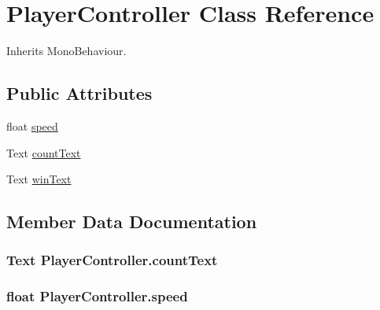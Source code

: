 \hypertarget{class_player_controller}{}\section{Player\+Controller Class Reference}
\label{class_player_controller}


Inherits Mono\+Behaviour.

\subsection*{Public Attributes}
\begin{DoxyCompactItemize}
\item 
float \hyperlink{class_player_controller_a0928605583f0563cd84fe43119d336ec}{speed}
\item 
Text \hyperlink{class_player_controller_a61795bee5f0ca4705f688419919e3086}{count\+Text}
\item 
Text \hyperlink{class_player_controller_a366f431ae274e7b19365f7b15b1709b8}{win\+Text}
\end{DoxyCompactItemize}


\subsection{Member Data Documentation}
\subsubsection[{\texorpdfstring{count\+Text}{countText}}]{\setlength{\rightskip}{0pt plus 5cm}Text Player\+Controller.\+count\+Text}\hypertarget{class_player_controller_a61795bee5f0ca4705f688419919e3086}{}\label{class_player_controller_a61795bee5f0ca4705f688419919e3086}
\subsubsection[{\texorpdfstring{speed}{speed}}]{\setlength{\rightskip}{0pt plus 5cm}float Player\+Controller.\+speed}\hypertarget{class_player_controller_a0928605583f0563cd84fe43119d336ec}{}\label{class_player_controller_a0928605583f0563cd84fe43119d336ec}
